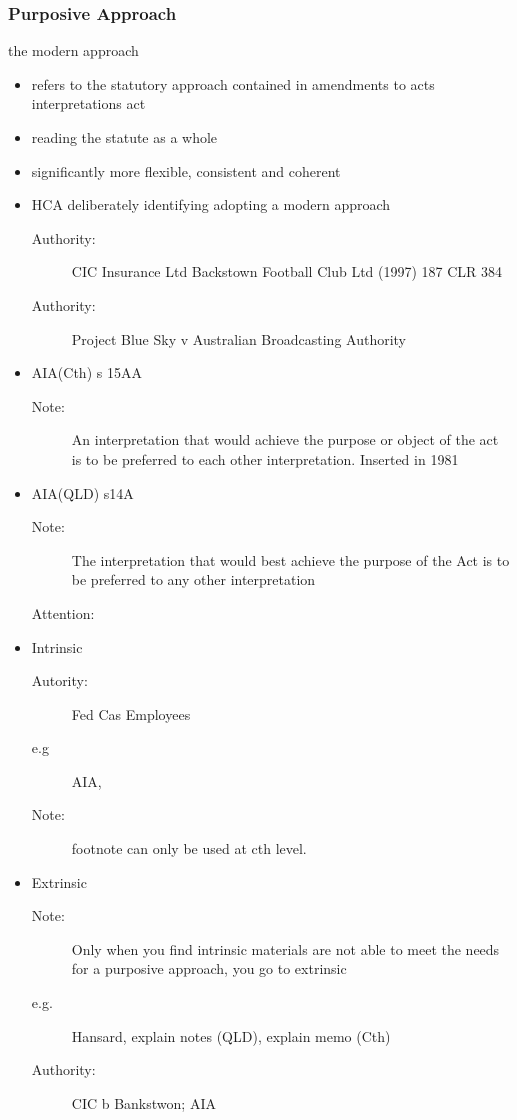 \subsubsection*{Purposive Approach}
the modern approach
\begin{itemize}
    \item refers to the statutory approach contained in amendments to acts interpretations act
    \item reading the statute as a whole
    \item significantly more flexible, consistent and coherent
    \item HCA deliberately identifying adopting a modern approach
        \begin{description}
            \item[Authority:]CIC Insurance Ltd Backstown Football Club Ltd (1997) 187 CLR 384 
            \item[Authority:] Project Blue Sky v Australian Broadcasting Authority
        \end{description}
    \item AIA(Cth) s 15AA
        \begin{description}
            \item[Note:] An interpretation that would achieve the purpose or object of the act is to be preferred to each other interpretation. Inserted in 1981
        \end{description}
    \item AIA(QLD) s14A
        \begin{description}
            \item[Note:] The interpretation that would best achieve the purpose of the Act is to be preferred to any other interpretation 
            \item[Attention:] 
        \end{description}
    \item Intrinsic 
        \begin{description}
            \item[Autority:] Fed Cas Employees 
            \item[e.g] AIA,
            \item[Note:]footnote can only be used at cth level. 
        \end{description}
    \item Extrinsic 
        \begin{description}
            \item[Note:]Only when you find intrinsic materials are not able to meet the needs for a purposive approach, you go to extrinsic 
            \item[e.g.] Hansard, explain notes (QLD), explain memo (Cth)
            \item[Authority:]CIC b Bankstwon; AIA
        \end{description}
\end{itemize}

